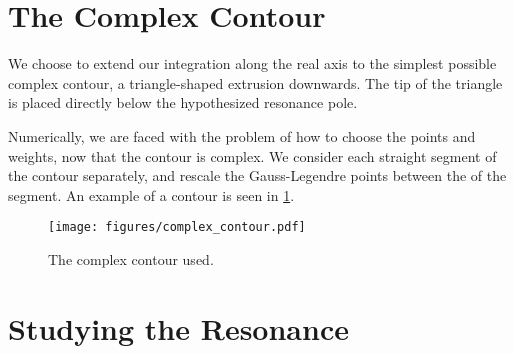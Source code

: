 

\section{The Complex Contour}

We choose to extend our integration along the real axis to 
the simplest possible complex contour, a triangle-shaped 
extrusion downwards. The tip of the triangle is placed directly 
below the hypothesized resonance pole.

Numerically, we are faced with the problem of how to choose 
the points and weights, now that the contour is complex. 
We consider each straight segment of the contour separately, 
and rescale the Gauss-Legendre points between the 
of the segment. An example of a contour is seen in 
\cref{fig:triangle contour}.

\begin{figure}[H]
  \centering
    \texttt{[image: figures/complex\_contour.pdf]}
  \caption{The complex contour used.}
  \label{fig:triangle contour}
\end{figure}

\section{Studying the Resonance}

